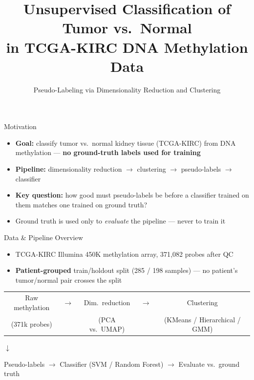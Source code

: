 \documentclass[aspectratio=169]{beamer}
\title[Unsupervised KIRC Classification]{Unsupervised Classification of Tumor vs.\ Normal \\ in TCGA-KIRC DNA Methylation Data}
\subtitle{Pseudo-Labeling via Dimensionality Reduction and Clustering}
\author{}
\date{}
\begin{document}
\begin{frame}
  \titlepage
\end{frame}

\begin{frame}{Motivation}
  \begin{itemize}
    \item \textbf{Goal:} classify tumor vs.\ normal kidney tissue (TCGA-KIRC) from DNA methylation --- \textbf{no ground-truth labels used for training}
    \item \textbf{Pipeline:} dimensionality reduction $\rightarrow$ clustering $\rightarrow$ pseudo-labels $\rightarrow$ classifier
    \item \textbf{Key question:} how good must pseudo-labels be before a classifier trained on them matches one trained on ground truth?
    \item Ground truth is used only to \emph{evaluate} the pipeline --- never to train it
  \end{itemize}
\end{frame}

\begin{frame}{Data \& Pipeline Overview}
  \begin{itemize}
    \item TCGA-KIRC Illumina 450K methylation array, 371{,}082 probes after QC
    \item \textbf{Patient-grouped} train/holdout split (285 / 198 samples) --- no patient's tumor/normal pair crosses the split
  \end{itemize}
  \vspace{0.3cm}
  \begin{center}
  \begin{tabular}{ccccc}
    Raw methylation & $\rightarrow$ & Dim.\ reduction & $\rightarrow$ & Clustering \\
    (371k probes)   &               & (PCA vs.\ UMAP) &               & (KMeans / Hierarchical / GMM) \\
  \end{tabular}
  \vspace{0.2cm}

  $\downarrow$

  \vspace{0.2cm}
  Pseudo-labels $\rightarrow$ Classifier (SVM / Random Forest) $\rightarrow$ Evaluate vs.\ ground truth
  \end{center}
\end{frame}
\end{document}
